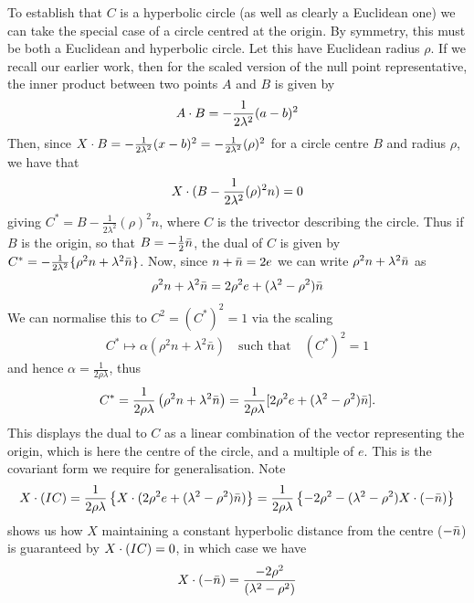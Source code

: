 To establish that $C$ is a hyperbolic circle (as well as
clearly a Euclidean one) we can take the special case of a circle
centred at the origin. By symmetry, this must be both a Euclidean
and hyperbolic circle. Let this have Euclidean radius $\rho$.
If we recall our earlier work, then for the scaled version of the
null point representative, the inner product between two points
$A$ and $B$ is given by
%
\begin{equation}
     A\cdot B = -\frac{1}{2\lambda^2}(a-b)^2
     \end{equation}
%
Then, since $X\cdot B = -\frac{1}{2\lambda^2}(x-b)^2 =
-\frac{1}{2\lambda^2}(\rho)^2$ for a circle centre $B$ and radius
$\rho$, we have that
%
\begin{equation}
  X\cdot (B-\frac{1}{2\lambda^2}(\rho)^2n)=0
\end{equation}
%
giving $C^*=B-\frac{1}{2\lambda^2}(\rho)^2n$, where $C$ is the
trivector describing the circle. Thus if $B$ is the origin, so
that $B = -\frac{1}{2}\bar{n}$, the dual of $C$ is given by $C^* =
-\frac{1}{2\lambda^2}\{\rho^2 n + \lambda^2\bar{n}\}$. Now, since
$n+\bar{n} = 2e$ we can write $\rho^2 n + \lambda^2\bar{n}$ as
%
\begin{equation} \label{eqn:dual-to-C}
\rho^2 n + \lambda^2 \bar{n} = 2 \rho^2 e + (\lambda^2 -
\rho^2) \bar{n}
\end{equation}
%
We can normalise this to $C^2=(C^{*})^2=1$ via the scaling
\[C^* \mapsto \alpha(\rho^2n + \lambda^2\bar{n})\quad\mbox{such that}
\quad(C^{*})^2 = 1
\]
and hence $\alpha = \frac{1}{2\rho\lambda}$, thus
\begin{equation}
C^* = \frac{1}{2 \rho \lambda} \left(\rho^2 n + \lambda^2 
\bar{n}\right)
		=
\frac{1}{2\rho\lambda}[2\rho^2e + (\lambda^2 - \rho^2)\bar{n}].
\end{equation}
%
This displays the dual to $C$ as a linear combination of
the vector representing the origin, which is here the
centre of the circle, and a multiple of $e$. This is the
covariant form we require for generalisation. Note
%
%
\begin{equation}
X \cdot (IC) = \frac{1}{2 \rho \lambda} \left\{ X \cdot (2 \rho^2 e +
(\lambda^2 - \rho^2) \bar{n}) \right\} = \frac{1}{2 \rho \lambda}
\left\{ -2\rho^2 -(\lambda^2-\rho^2) X \cdot (-\bar{n}) \right\}
\end{equation}
%
shows us how $X$ maintaining a constant hyperbolic distance
from the centre ($-\bar{n}$) is guaranteed by $X \cdot (IC)=0$, in which
case we have
%
\begin{equation}
X \cdot (-\bar{n}) = \frac{-2\rho^2}{(\lambda^2 - \rho^2)}
\end{equation}
